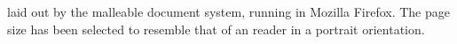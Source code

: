 \begin{center}
\vspace{0.2in}
\hspace{0.05\textwidth}
\end{center}


\clearpage


\cite{Pinkney2011} laid out by the malleable document system, running in Mozilla Firefox. The page size has been selected to resemble that of an \ebook{} reader in a portrait orientation.

